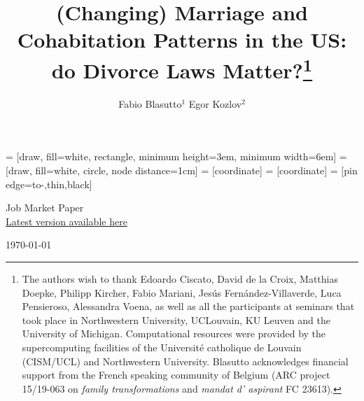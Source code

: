 \documentclass[12pt]{article}
\title{(Changing) Marriage and Cohabitation Patterns in the US: do Divorce Laws Matter?\thanks{The authors wish to thank Edoardo Ciscato, David de la Croix, Matthias Doepke, Philipp Kircher, Fabio Mariani, Jesús Fernández-Villaverde, Luca Pensieroso, Alessandra Voena, as well as all the participants at seminars that took place in Northwestern University, UCLouvain, KU Leuven and the University of Michigan. Computational resources were provided by the supercomputing facilities of the Université catholique de Louvain (CISM/UCL) and Northwestern University. Blasutto acknowledges financial support from the French speaking community of Belgium (ARC project 15/19-063 on \textit{family transformations} and \textit{mandat d' aspirant} FC 23613).}}
\author{\large Fabio Blasutto$^1$ \quad Egor Kozlov$^2$}
\date{}
\numberwithin{table}{section}
\begin{document}
	 	 = [draw, fill=white, rectangle, 
	minimum height=3em, minimum width=6em]
	 = [draw, fill=white, circle, node distance=1cm]
	 = [coordinate]
	 = [coordinate]
	 = [pin edge={to-,thin,black}]
	
	
	
	
	\maketitle
	
\vspace{-2cm}
\begin{center}\large	
	Job Market Paper\\
	\href{https://drive.google.com/file/d/1utFkMPdUR5yb07oyJI7Vx1BJDLfYgMHi/view?usp=sharing}{Latest version available here}
\end{center}
\begin{center}\large
	\today
\end{center}



	
\end{document}
